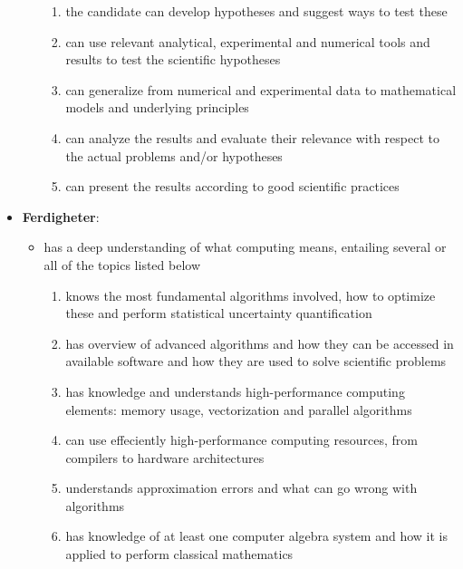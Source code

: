 \documentclass{article}
\begin{document}
\begin{itemize}
\begin{itemize}
\begin{enumerate}
 \item the candidate can develop hypotheses and suggest ways to test these

 \item can use relevant analytical, experimental and numerical tools and results to test the scientific hypotheses

 \item can generalize from numerical and experimental data to mathematical models and underlying principles

 \item can analyze the results and evaluate their relevance with respect to the actual problems and/or hypotheses

 \item can present the results according to good scientific practices

\end{enumerate}

\noindent
\end{itemize}

\noindent
\item \textbf{Ferdigheter}: 
\begin{itemize}

 \item has a deep understanding of what computing means, entailing several or all of the topics listed below
\begin{enumerate}

 \item knows the most fundamental algorithms involved, how to optimize these and perform statistical uncertainty quantification

 \item has overview of advanced algorithms and how they can be accessed in available software and how they are used to solve scientific problems

 \item has knowledge and understands high-performance computing elements: memory usage, vectorization and parallel algorithms

 \item can use effeciently high-performance computing resources, from compilers to hardware architectures

 \item understands approximation errors and what can go wrong with algorithms

 \item has knowledge of at least one computer algebra system and how it is applied to perform classical mathematics


\end{enumerate}
\end{itemize}
\end{itemize}
\end{document}
